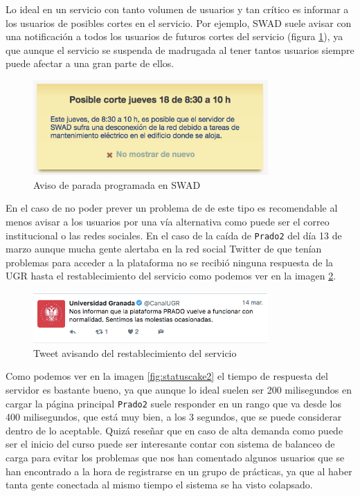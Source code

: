 \bigskip
Lo ideal en un servicio con tanto volumen de usuarios y tan crítico es informar a los usuarios de posibles cortes en el servicio. Por ejemplo, SWAD suele avisar con una notificación a todos los usuarios de futuros cortes del servicio (figura \ref{fig:paroprogramadoswad}), ya que aunque el servicio se suspenda de madrugada al tener tantos usuarios siempre puede afectar a una gran parte de ellos.

\begin{figure}[H]
\centering
\includegraphics[width=0.8\textwidth]{../images/paroprogramadoswad}
\caption{Aviso de parada programada en SWAD}
\label{fig:paroprogramadoswad}
\end{figure}

\bigskip
En el caso de no poder prever un problema de de este tipo es recomendable al menos avisar a los usuarios por una vía alternativa como puede ser el correo institucional o las redes sociales. En el caso de la caída de \texttt{Prado2} del día 13  de marzo aunque mucha gente alertaba en la red social Twitter de que tenían problemas para acceder a la plataforma no se recibió ninguna respuesta de la UGR hasta el restablecimiento del servicio como podemos ver en la imagen \ref{fig:tweet}.



\begin{figure}[H]
\centering
\includegraphics[width=0.8\textwidth]{../images/tweet}
\caption{Tweet avisando del restablecimiento del servicio}
\label{fig:tweet}
\end{figure}

\bigskip
Como podemos ver en la imagen \ref{fig:statuscake2} el tiempo de respuesta del servidor es bastante bueno, ya que aunque lo ideal suelen ser 200 milisegundos en cargar la página principal \texttt{Prado2} suele responder en un rango que va desde los 400 milisegundos, que está muy bien, a los 3 segundos, que se puede considerar dentro de lo aceptable. Quizá reseñar que en caso de alta demanda como puede ser el inicio del curso puede ser interesante contar con sistema de balanceo de carga para evitar los problemas que nos han comentado algunos usuarios que se han encontrado a la hora de registrarse en un grupo de prácticas, ya que al haber tanta gente conectada al mismo tiempo el sistema se ha visto colapsado.



